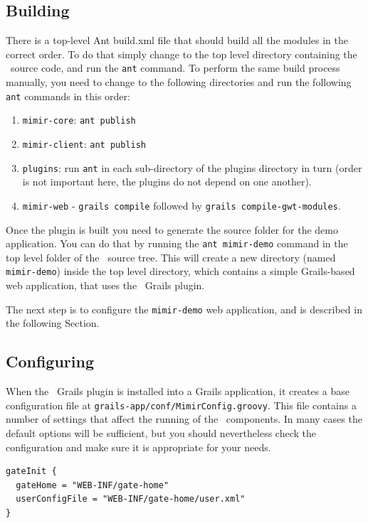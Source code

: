 \subsection{Building}\label{sec:building}

There is a top-level Ant build.xml file that should build all the modules in
the correct order. To do that simply change to the top level directory
containing the \Mimir\ source code, and run the {\tt ant} command. To perform
the same build process manually, you need to change to the following directories
and run the following {\tt ant} commands in this order:
\begin{enumerate}
\item {\tt mimir-core}: {\tt ant publish}
\item {\tt mimir-client}: {\tt ant publish}
\item {\tt plugins}: run {\tt ant} in each sub-directory of the plugins
  directory in turn (order is not important here, the plugins do not depend on
  one another).
\item {\tt mimir-web} - {\tt grails compile} followed by {\tt grails
  compile-gwt-modules}.
\end{enumerate}

Once the plugin is built you need to generate the source folder for the demo
application. You can do that by running the {\tt ant mimir-demo} command in the
top level folder of the \Mimir\ source tree. This will create a new directory
(named {\tt mimir-demo}) inside the top level directory, which contains a simple
Grails-based web application, that uses the \Mimir\ Grails plugin.

The next step is to configure the {\tt mimir-demo} web application, and is
described in the following Section.

\subsection{Configuring}\label{sec:admin:config}

When the \Mimir\ Grails plugin is installed into a Grails application, it
creates a base configuration file at {\tt grails-app/conf/MimirConfig.groovy}.
This file contains a number of settings that affect the running of the \Mimir\
components. In many cases the default options will be sufficient, but you should
nevertheless check the configuration and make sure it is appropriate for your
needs.

\begin{lstlisting}
gateInit {
  gateHome = "WEB-INF/gate-home"
  userConfigFile = "WEB-INF/gate-home/user.xml"
}
\end{lstlisting}

